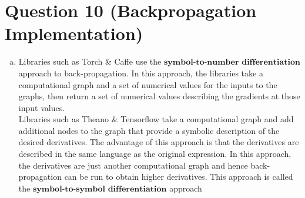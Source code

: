 \documentclass[fleqn]{article}
\begin{document}
\section*{Question 10 (Backpropagation Implementation)}
	\begin{enumerate}[a)]
		\item
		Libraries such as Torch \& Caffe use the $\textbf{symbol-to-number differentiation}$ approach to 
		back-propagation. In this approach, the libraries take a computational graph and a set of numerical 
		values for the inputs to the graphs, then return a set of numerical values describing the gradients at 
		those input values. \hfill \break
		\\
		Libraries such as Theano \& Tensorflow take a computational graph and add additional nodes to the 
		graph that provide a symbolic description of the desired derivatives. The advantage of this approach 
		is that the derivatives are described in the same language as the original expression. In this approach, 
		the derivatives are just another computational graph and hence back-propagation can be run to obtain 
		higher derivatives. This approach is called the $\textbf{symbol-to-symbol differentiation}$ approach
		

\end{enumerate}
\end{document}
